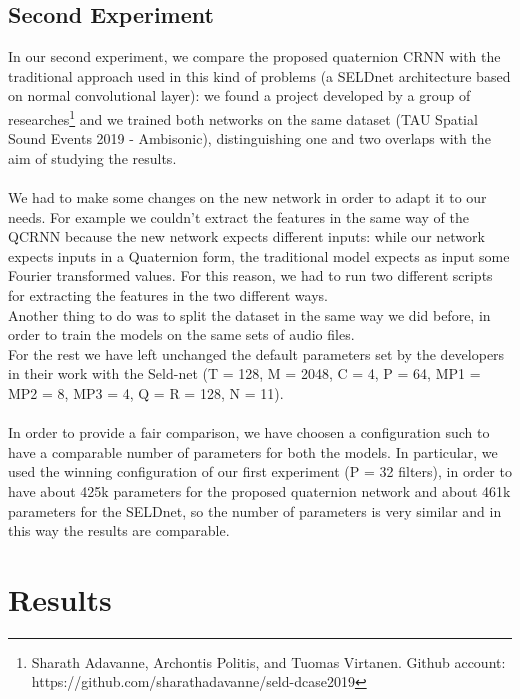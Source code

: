 \documentclass{article}
\begin{document}
    \subsection*{Second Experiment}
    In our second experiment, we compare the proposed quaternion CRNN with the traditional approach used in this kind of problems (a SELDnet architecture based on normal convolutional layer): we found a project developed by a group of researches\footnote{ Sharath Adavanne, Archontis Politis, and Tuomas Virtanen. Github account: https://github.com/sharathadavanne/seld-dcase2019} and we trained both networks on the same dataset (TAU Spatial Sound Events 2019 - Ambisonic), distinguishing one and two overlaps with the aim of studying the results.\\
    \\
    We had to make some changes on the new network in order to adapt it to our needs. For example we couldn't extract the features in the same way of the QCRNN because the new network expects different inputs: while our network expects inputs in a Quaternion form, the traditional model expects as input some Fourier transformed values. For this reason, we had to run two different scripts for extracting the features in the two different ways. \\
    Another thing to do was to split the dataset in the same way we did before, in order to train the models on the same sets of audio files.\\
	For the rest we have left unchanged the default parameters set by the developers in their work with the Seld-net (T = 128, M = 2048, C = 4, P = 64, MP1 = MP2 = 8, MP3 = 4, Q = R = 128, N = 11).\\
	\\
	In order to provide a fair comparison, we have choosen a configuration such to have a comparable number of parameters for both the models. In particular, we used the winning configuration of our first experiment (P = 32 filters), in order to have about 425k parameters for the proposed quaternion network and about 461k parameters for the SELDnet, so the number of parameters is very similar and in this way the results are comparable. \\
    \section{Results}
\end{document}
